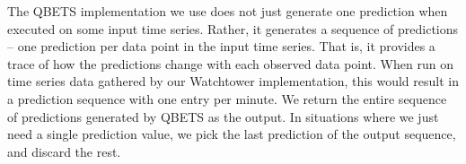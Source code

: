 The QBETS implementation we use does not just generate one prediction when executed on
some input time series. Rather, it generates a sequence of predictions -- one prediction per data point in the input
time series. That is, it provides a trace of how the predictions change with each observed data point.
When run on time series data gathered by our Watchtower implementation,
this would result in a prediction sequence with one entry per minute.
We return the entire sequence of predictions generated by QBETS
as the output. In situations where we just need a single prediction value, we pick the last prediction of the output
sequence, and discard the rest.

